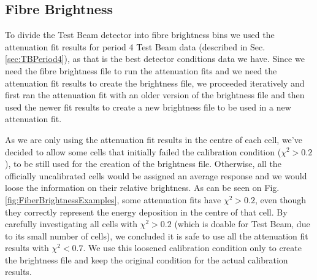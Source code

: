 
\subsection{Fibre Brightness}\label{sec:FibreBrightnessTB}

To divide the Test Beam detector into fibre brightness bins we used the attenuation fit results for period 4 Test Beam data (described in Sec. \ref{sec:TBPeriod4}), as that is the best detector conditions data we have. Since we need the fibre brightness file to run the attenuation fits and we need the attenuation fit results to create the brightness file, we proceeded iteratively and first ran the attenuation fit with an older version of the brightness file and then used the newer fit results to create a new brightness file to be used in a new attenuation fit.

As we are only using the attenuation fit results in the centre of each cell, we've decided to allow some cells that initially failed the calibration condition ($\chi^2>0.2$), to be still used for the creation of the brightness file. Otherwise, all the officially uncalibrated cells would be assigned an average response and we would loose the information on their relative brightness. As can be seen on Fig. \ref{fig:FiberBrightnessExamples}, some attenuation fits have $\chi^2>0.2$, even though they correctly represent the energy deposition in the centre of that cell. By carefully investigating all cells with $\chi^2>0.2$ (which is doable for Test Beam, due to its small number of cells), we concluded it is safe to use all the attenuation fit results with $\chi^2<0.7$. We use this loosened calibration condition only to create the brightness file and keep the original condition for the actual calibration results.



